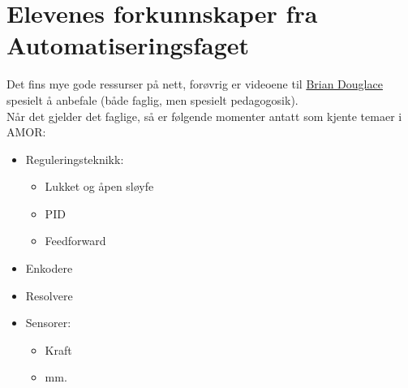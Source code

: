 \section{Elevenes forkunnskaper fra Automatiseringsfaget} \label{Sec: KoordDataEl}

    Det fins mye gode ressurser på nett, forøvrig er videoene til \href{https://www.youtube.com/user/ControlLectures}{Brian Douglace} spesielt å anbefale (både faglig, men spesielt pedagogosik).\\
    Når det gjelder det faglige, så er følgende momenter antatt som kjente temaer i AMOR:
    \begin{itemize}
        \item Reguleringsteknikk:
            \begin{itemize}
                \item Lukket og åpen sløyfe
                \item PID
                \item Feedforward
            \end{itemize}
        \item Enkodere
        \item Resolvere
        \item Sensorer:
            \begin{itemize}
                \item Kraft
                \item mm.
            \end{itemize}
    \end{itemize}
